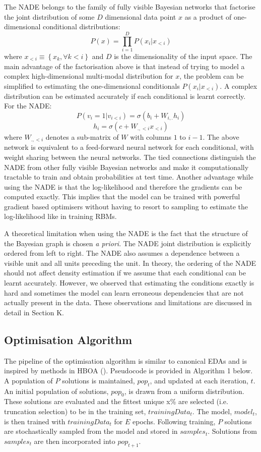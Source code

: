 \documentclass[twoside]{article}
\begin{document}
The NADE belongs to the family of fully visible Bayesian networks that factorise the joint distribution of some $D$ dimensional data point $x$ as a product of one-dimensional conditional distributions:
$$ P(x) = \prod_{i=1}^{D} P(x_i|x_{<i})$$ where $x_{<i} \equiv \left\{ x_k, \forall k < i \right\} $  and $D$ is the dimensionality of the input space. The main advantage of the factorisation above is that instead of trying to model a complex high-dimensional multi-modal distribution for $x$, the problem can be simplified to estimating the one-dimensional conditionals $P(x_i|x_{<i})$. A complex distribution can be estimated accurately if each conditional is learnt correctly. For the NADE: 
$$P(v_i=1|v_{i<i}) =  \sigma(b_i + W_{i,.}h_i)$$
$$ h_i = \sigma(c+W_{.,<i}x_{<i})$$ where $W_{.,<i}$ denotes a sub-matrix of $W$ with columns $1$ to $i-1$. 
The above network is equivalent to a feed-forward neural network for each conditional, with weight sharing between the neural networks. The tied connections distinguish the NADE from other fully visible Bayesian networks and make it computationally tractable to train and obtain probabilities at test time. Another advantage while using the NADE is that the log-likelihood and therefore the gradients can be computed exactly. This implies that the model can be trained with powerful gradient based optimisers without having to resort to sampling to estimate the log-likelihood like in training RBMs. 

A theoretical limitation when using the NADE is the fact that the structure of the Bayesian graph is chosen \emph{a priori}. The NADE joint distribution is explicitly ordered from left to right. The NADE also assumes a dependence between a visible unit and all units preceding the unit. In theory, the ordering of the NADE should not affect density estimation if we assume that each conditional can be learnt accurately. However, we observed that estimating the conditions exactly is hard and sometimes the model can learn erroneous dependencies that are not actually present in the data. These observations and limitations are discussed in detail in Section K. 



\subsection{Optimisation Algorithm}

The pipeline of the optimisation algorithm is similar to canonical EDAs and is inspired by methods in HBOA (\cite{hboa}). Pseudocode is provided in Algorithm 1 below. A population of \(P\) solutions is maintained, \(pop_t\), and updated at each iteration, \(t\). An initial population of solutions, \(pop_0\), is drawn from a uniform distribution. These solutions are evaluated and the fittest unique x\% are selected (i.e. truncation selection) to be in the training set, \(trainingData_t\). The model, \(model_t\), is then trained with \(trainingData_t\) for \(E\) epochs. Following training, \(P\) solutions are stochastically sampled from the model and stored in \(samples_t\). Solutions from \(samples_t\) are then incorporated into \(pop_{t+1}\).
\end{document}
